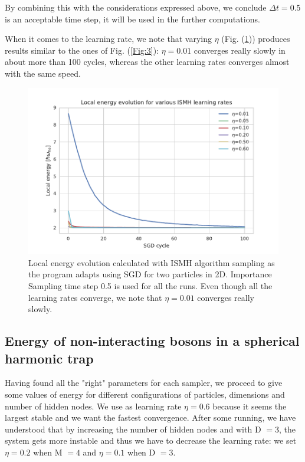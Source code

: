 By combining this with the considerations expressed above, we conclude $\Delta t= 0.5$ is an acceptable time step, it will be used in the further computations. 

When it comes to the learning rate, we note that varying $\eta$ (Fig. (\ref{Fig:6})) produces results similar to the ones of Fig. (\ref{Fig:3}): $\eta=0.01$ converges really slowly in about more than 100 cycles, whereas the other learning rates converges almost with the same speed.



\begin{figure}[H]
\centering
\includegraphics[scale=1.0]{plot6.pdf}
\caption{Local energy evolution calculated with ISMH algorithm sampling as the program adapts using SGD for two particles in 2D. Importance Sampling time step 0.5 is used for all the runs. Even though all the learning rates converge, we note that $\eta=0.01$ converges really slowly.}
\label{Fig:6}
\end{figure} 


\subsection{Energy of non-interacting bosons in a spherical harmonic trap}
Having found all the "right" parameters for each sampler, we proceed to give some values of energy for different configurations of particles, dimensions and number of hidden nodes. We use as learning rate $\eta=0.6$ because it seems the largest stable and we want the fastest convergence. After some running, we have understood that by increasing the number of hidden nodes and with D $=3$, the system gets more instable and thus we have to decrease the learning rate: we set $\eta=0.2$ when M $=4$ and $\eta=0.1$  when D $=3$.

